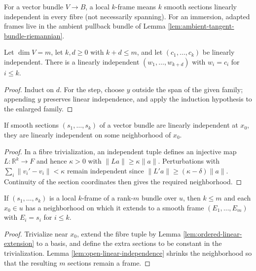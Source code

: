 For a vector bundle $V\to B$, a local $k$-frame means $k$ smooth sections linearly independent in every fibre (not necessarily spanning). For an immersion, adapted frames live in the ambient pullback bundle of Lemma \ref{lem:ambient-tangent-bundle-riemannian}.

\begin{lemma}
\label{lem:ordered-linear-extension}
\leanok
Let $\dim V=m$, let $k,d\ge0$ with $k+d\le m$, and let $(c_1,\ldots,c_k)$ be linearly independent. There is a linearly independent $(w_1,\ldots,w_{k+d})$ with $w_i=c_i$ for $i\le k$.
\end{lemma}
\begin{proof}
\leanok
\sketch Induct on $d$. For the step, choose $y$ outside the span of the given family; appending $y$ preserves linear independence, and apply the induction hypothesis to the enlarged family.
\end{proof}

\begin{lemma}
\label{lem:open-linear-independence}
\leanok
If smooth sections $(s_1,\ldots,s_k)$ of a vector bundle are linearly independent at $x_0$, they are linearly independent on some neighborhood of $x_0$.
\end{lemma}
\begin{proof}
\leanok
\sketch In a fibre trivialization, an independent tuple defines an injective map $L:\mathbb R^k\to F$ and hence $\kappa>0$ with $\|La\|\ge\kappa\|a\|$. Perturbations with $\sum_i\|v_i'-v_i\|<\kappa$ remain independent since $\|L'a\|\ge(\kappa-\delta)\|a\|$. Continuity of the section coordinates then gives the required neighborhood.
\end{proof}

\begin{lemma}
\label{lem:partial-frame-extension}
\leanok
{}
If $(s_1,\ldots,s_k)$ is a local $k$-frame of a rank-$m$ bundle over $u$, then $k\le m$ and each $x_0\in u$ has a neighborhood on which it extends to a smooth frame $(E_1,\ldots,E_m)$ with $E_i=s_i$ for $i\le k$.
\end{lemma}
\begin{proof}
\leanok
\sketch Trivialize near $x_0$, extend the fibre tuple by Lemma \ref{lem:ordered-linear-extension} to a basis, and define the extra sections to be constant in the trivialization. Lemma \ref{lem:open-linear-independence} shrinks the neighborhood so that the resulting $m$ sections remain a frame.
\end{proof}

